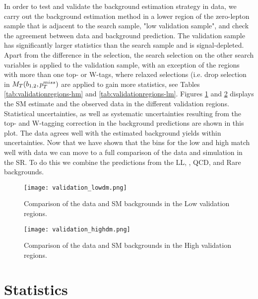 In order to test and validate the background estimation strategy in data, we carry out the background estimation method in a lower \met{} region of the zero-lepton sample that is adjacent to the search sample, "low \met{} validation sample", and check the agreement between data and background prediction. The validation sample has significantly larger statistics than the search sample and is signal-depleted. Apart from the difference in the \met{} selection, the search selection on the other search variables is applied to the validation sample, with an exception of the regions with more than one top- or W-tags, where relaxed selections (i.e. drop selection in $M_T(b_{1,2},p_{T}^{miss})$ are applied to gain more statistics, see Tables \ref{tab:validationregions-hm} and \ref{tab:validationregions-lm}. Figures \ref{fig:validation-region-lm} and \ref{fig:validation-region-hm} displays the SM estimate and the observed data in the different validation regions. Statistical uncertainties, as well as systematic uncertainties resulting from the top- and W-tagging correction in the background predictions are shown in this plot. The data agrees well with the estimated background yields within uncertainties. Now that we have shown that the bins for the low and high \dm{} match well with data we can move to a full comparison of the data and simulation in the SR. To do this we combine the predictions from the LL, \Znunu, QCD, and Rare backgrounds.

\begin{figure}
	\begin{center}
  \texttt{[image: validation\_lowdm.png]}
	\end{center}
	\caption[LM Validation Region]{Comparison of the data and SM backgrounds in the Low \dm{} validation regions.
	 }
	\label{fig:validation-region-lm}
\end{figure}

\begin{figure}
	\begin{center}
  \texttt{[image: validation\_highdm.png]}
	\end{center}
	\caption[Lost Lepton HM Control Region]{Comparison of the data and SM backgrounds in the High \dm{} validation regions.
	 }
	\label{fig:validation-region-hm}
\end{figure}

\section{Statistics}\label{sec:Statistics}

